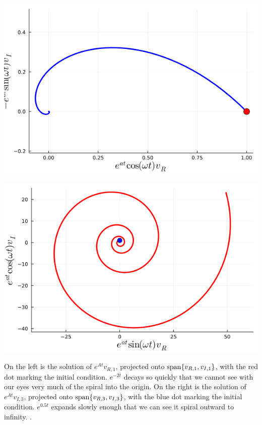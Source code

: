 \begin{center}
    \begin{minipage}{0.45\columnwidth}
        \includegraphics[width=\linewidth]{graphics/Chap09/SpiralInwardPreviousExample.png}
    \end{minipage}
    \hfill
    \begin{minipage}{0.45\columnwidth}
        \includegraphics[width=\linewidth]{graphics/Chap09/SpiralOutwardPreviousExample.png}
    \end{minipage}
\end{center}

On the left is the solution of $e^{At}v_{R,1}$, projected onto $\mathrm{span} \{ v_{R,1}, v_{I,1} \}$, with the red dot marking the initial condition. $e^{-2t}$ decays so quickly that we cannot see with our eyes very much of the spiral into the origin. On the right is the solution of $e^{At}v_{I,3}$, projected onto $\mathrm{span} \{ v_{R,3}, v_{I,3} \}$, with the blue dot marking the initial condition. $e^{0.5t}$ expands slowly enough that we can see it spiral outward to infinity.
\Qed.


